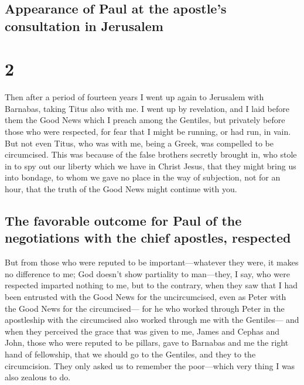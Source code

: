 \hypertarget{appearance-of-paul-at-the-apostles-consultation-in-jerusalem}{%
\subsection{Appearance of Paul at the apostle's consultation in
Jerusalem}\label{appearance-of-paul-at-the-apostles-consultation-in-jerusalem}}

\hypertarget{section-1}{%
\section{2}\label{section-1}}

 Then after a period of fourteen years I went up again to
Jerusalem with Barnabas, taking Titus also with me.  I
went up by revelation, and I laid before them the Good News which I
preach among the Gentiles, but privately before those who were
respected, for fear that I might be running, or had run, in vain.
 But not even Titus, who was with me, being a Greek, was
compelled to be circumcised.  This was because of the
false brothers secretly brought in, who stole in to spy out our liberty
which we have in Christ Jesus, that they might bring us into bondage,
 to whom we gave no place in the way of subjection, not
for an hour, that the truth of the Good News might continue with you.

\hypertarget{the-favorable-outcome-for-paul-of-the-negotiations-with-the-chief-apostles-respected}{%
\subsection{The favorable outcome for Paul of the negotiations with the
chief apostles,
respected}\label{the-favorable-outcome-for-paul-of-the-negotiations-with-the-chief-apostles-respected}}

 But from those who were reputed to be
important---whatever they were, it makes no difference to me; God
doesn't show partiality to man---they, I say, who were respected
imparted nothing to me,  but to the contrary, when they
saw that I had been entrusted with the Good News for the uncircumcised,
even as Peter with the Good News for the circumcised--- 
for he who worked through Peter in the apostleship with the circumcised
also worked through me with the Gentiles---  and when they
perceived the grace that was given to me, James and Cephas and John,
those who were reputed to be pillars, gave to Barnabas and me the right
hand of fellowship, that we should go to the Gentiles, and they to the
circumcision.  They only asked us to remember the
poor---which very thing I was also zealous to do.

